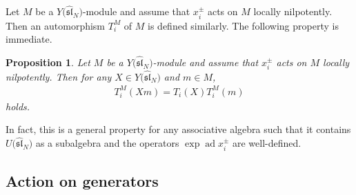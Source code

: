 \documentclass[10pt,a4paper]{amsart}
\newtheorem{prop}[thm]{Proposition}
\theoremstyle{definition}
\numberwithin{equation}{section}
\DeclareMathOperator{\ad}{ad}
\newcommand{\affY}{Y\big(\affsl\big)}
\newcommand{\affsl}{\hat{\mathfrak{sl}}_N}
\begin{document}
Let $M$ be a $\affY$-module and assume that $x_i^{\pm}$ acts on $M$ locally nilpotently. Then an automorphism $T_i^M$ of $M$ is defined similarly. The following property is immediate.
\begin{prop}Let $M$ be a $\affY$-module and assume that $x_i^{\pm}$ acts on $M$ locally nilpotently. Then for any $X \in \affY$ and $m \in M$,
\begin{gather*}
T_i^M(Xm)=T_i(X)T_i^M(m)
\end{gather*}
holds.
\end{prop}

In fact, this is a general property for any associative algebra such that it contains $U\big(\affsl\big)$ as a subalgebra and the operators $\exp\ad x_i^{\pm}$ are well-defined.

\subsection{Action on generators}
\end{document}
